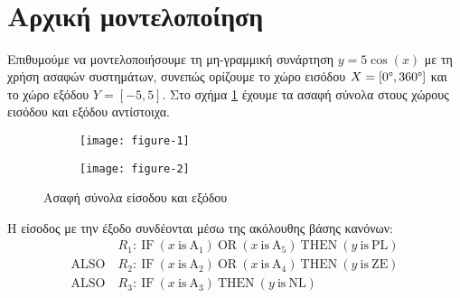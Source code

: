 \documentclass[11pt,a4paper,titlepage, oneside]{article}
\title{
	\vspace{5cm}
	\Huge{\sffamily{\hmwkClass}}\\
	\vspace{0.1em}
	\LARGE{\hmwkTitle}\\
	\vspace{7cm}
}
\author{\sffamily{\hmwkAuthorName\ - \hmwkAuthorAEM}}
\date{} %
\begin{document}
	
	\maketitle
	
	
	
	
	
	\section{Αρχική μοντελοποίηση}
	Επιθυμούμε να μοντελοποιήσουμε τη μη-γραμμική συνάρτηση $y = 5 \cos(x)$ με τη χρήση ασαφών συστημάτων, συνεπώς ορίζουμε το χώρο εισόδου $X = [0\degree, 360\degree]$ και το χώρο εξόδου $Y = [-5, 5]$. Στο σχήμα \ref{fig:fuzzy_set_plots_1} έχουμε τα ασαφή σύνολα στους χώρους εισόδου και εξόδου αντίστοιχα.\\
	\begin{figure}[h]
		\centering
		\begin{subfigure}[c]{0.495\textwidth}
			\texttt{[image: figure-1]}
		\end{subfigure}
		\begin{subfigure}[c]{0.495\textwidth}
			\texttt{[image: figure-2]}
		\end{subfigure}
		\caption{Ασαφή σύνολα είσοδου και εξόδου}
		\label{fig:fuzzy_set_plots_1}
	\end{figure}
	
	Η είσοδος με την έξοδο συνδέονται μέσω της ακόλουθης βάσης κανόνων:
	\begin{align*}
		& R_1\colon\ \text{IF}\ \left( x\ \text{is}\ \text{A}_1 \right)\ \text{OR}\ \left( x\ \text{is}\ \text{A}_5 \right)\ \text{THEN}\ \left( y\ \text{is}\ \text{PL} \right) \\
		\text{ALSO}\ & R_2\colon\ \text{IF}\ \left( x\ \text{is}\ \text{A}_2 \right)\ \text{OR}\ \left( x\ \text{is}\ \text{A}_4 \right)\ \text{THEN}\ \left( y\ \text{is}\ \text{ZE} \right) \\
		\text{ALSO}\ & R_3\colon\ \text{IF}\ \left( x\ \text{is}\ \text{A}_3 \right)\  \text{THEN}\ \left( y\ \text{is}\ \text{NL} \right)
	\end{align*}
	
\end{document}
